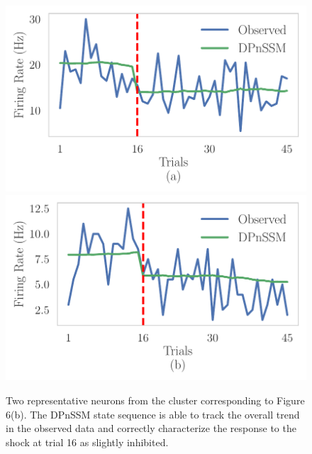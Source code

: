 \documentclass{article}
\begin{document}
\begin{figure}[H]
\begin{center}
\includegraphics[scale=0.5]{img/state-space-a.pdf}
\includegraphics[scale=0.5]{img/state-space-b.pdf}
\end{center}
\caption{Two representative neurons from the cluster corresponding to Figure 6(b).  The DPnSSM state sequence is able to track the overall trend in the observed data and correctly characterize the response to the shock at trial 16 as slightly inhibited.}
\label{fig:subtlecue}
\end{figure}



\end{document}

